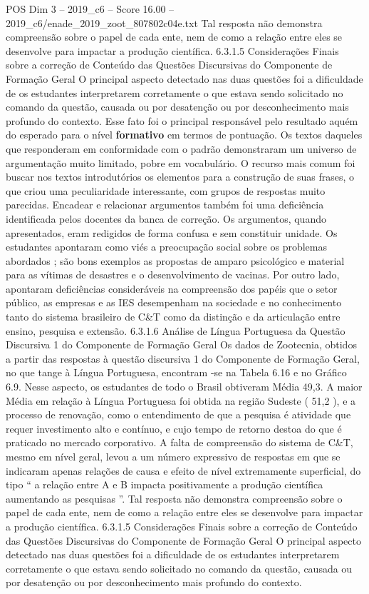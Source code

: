 \begin{textsample}{POS Dim 3 – 2019\_c6 – Score 16.00 – 2019\_c6/enade\_2019\_zoot\_807802c04e.txt}
Tal resposta não demonstra compreensão sobre o papel de cada ente, nem de como a relação entre eles se desenvolve para impactar a produção científica. 6.3.1.5 Considerações Finais sobre a correção de Conteúdo das Questões Discursivas do Componente de Formação Geral O principal aspecto detectado nas duas questões foi a dificuldade de os estudantes interpretarem corretamente o que estava sendo solicitado no comando da questão, causada ou por desatenção ou por desconhecimento mais profundo do contexto.
Esse fato foi o principal responsável pelo resultado aquém do esperado para o nível \textbf{formativo} em termos de pontuação.
Os textos daqueles que responderam em conformidade com o padrão demonstraram um universo de argumentação muito limitado, pobre em vocabulário.
O recurso mais comum foi buscar nos textos introdutórios os elementos para a construção de suas frases, o que criou uma peculiaridade interessante, com grupos de respostas muito parecidas.
Encadear e relacionar argumentos também foi uma deficiência identificada pelos docentes da banca de correção.
Os argumentos, quando apresentados, eram redigidos de forma confusa e sem constituir unidade.
Os estudantes apontaram como viés a preocupação social sobre os problemas abordados ; são bons exemplos as propostas de amparo psicológico e material para as vítimas de desastres e o desenvolvimento de vacinas.
Por outro lado, apontaram deficiências consideráveis na compreensão dos papéis que o setor público, as empresas e as IES desempenham na sociedade e no conhecimento tanto do sistema brasileiro de C\&T como da distinção e da articulação entre ensino, pesquisa e extensão. 6.3.1.6 Análise de Língua Portuguesa da Questão Discursiva 1 do Componente de Formação Geral Os dados de Zootecnia, obtidos a partir das respostas à questão discursiva 1 do Componente de Formação Geral, no que tange à Língua Portuguesa, encontram -se na Tabela 6.16 e no Gráfico 6.9.
Nesse aspecto, os estudantes de todo o Brasil obtiveram Média 49,3.
A maior Média em relação à Língua Portuguesa foi obtida na região Sudeste ( 51,2 ), e a processo de renovação, como o entendimento de que a pesquisa é atividade que requer investimento alto e contínuo, e cujo tempo de retorno destoa do que é praticado no mercado corporativo.
A falta de compreensão do sistema de C\&T, mesmo em nível geral, levou a um número expressivo de respostas em que se indicaram apenas relações de causa e efeito de nível extremamente superficial, do tipo “ a relação entre A e B impacta positivamente a produção científica aumentando as pesquisas ”.
Tal resposta não demonstra compreensão sobre o papel de cada ente, nem de como a relação entre eles se desenvolve para impactar a produção científica. 6.3.1.5 Considerações Finais sobre a correção de Conteúdo das Questões Discursivas do Componente de Formação Geral O principal aspecto detectado nas duas questões foi a dificuldade de os estudantes interpretarem corretamente o que estava sendo solicitado no comando da questão, causada ou por desatenção ou por desconhecimento mais profundo do contexto.

\end{textsample}
